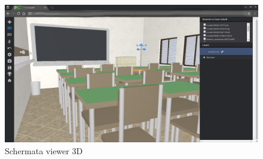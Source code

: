 \begin{figure}[htbp] %
   \centering
   \includegraphics[width=1\linewidth]{images/3d-school}
   \caption{Schermata viewer 3D}
   \label{fig:3D-school}
\end{figure}
\newpage

